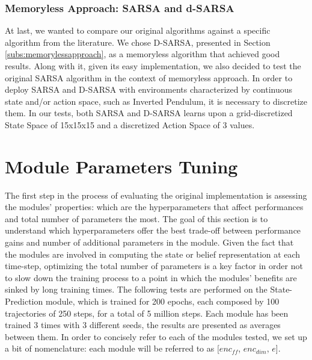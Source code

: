                 
            \subsubsection{Memoryless Approach: SARSA and d-SARSA}
                At last, we wanted to compare our original algorithms against a specific algorithm from the literature. We chose D-SARSA, presented in Section \ref{subs:memorylessapproach}, as a memoryless algorithm that achieved good results. Along with it, given its easy implementation, we also decided to test the original SARSA algorithm in the context of memoryless approach. \newline
                In order to deploy SARSA and D-SARSA with environments characterized by continuous state and/or action space, such as Inverted Pendulum, it is necessary to discretize them. In our tests, both SARSA and D-SARSA learns upon a grid-discretized State Space of 15x15x15 and a discretized Action Space of 3 values.
                
                
    \newpage
    \section{Module Parameters Tuning}
    \label{results:module_tuning}
        The first step in the process of evaluating the original implementation is assessing the modules' properties: which are the hyperparameters that affect performances and total number of parameters the most. The goal of this section is to understand which hyperparameters offer the best trade-off between performance gains and number of additional parameters in the module. Given the fact that the modules are involved in computing the state or belief representation at each time-step, optimizing the total number of parameters is a key factor in order not to slow down the training process to a point in which the modules' benefits are sinked by long training times. \newline
        The following tests are performed on the State-Prediction module, which is trained for 200 epochs, each composed by 100 trajectories of 250 steps, for a total of 5 million steps. Each module has been trained 3 times with 3 different seeds, the results are presented as averages between them. In order to concisely refer to each of the modules tested, we set up a bit of nomenclature: each module will be referred to as [$enc_{ff}$, $enc_{dim}$, $e$]. 
        

